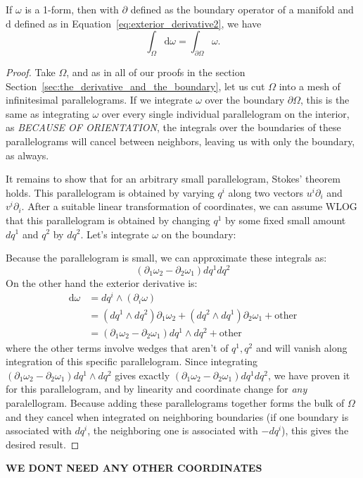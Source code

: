 \documentclass[../master.tex]{subfiles}
\begin{document}
	\begin{theorem}
		If $\omega$ is a 1-form, then with $\partial$ defined as the boundary operator of a manifold and $\mathrm d$ defined as in Equation~\eqref{eq:exterior_derivative2}, we have
		\begin{equation*} 
			\int_\Omega \mathrm d \omega = \int_{\partial \Omega} \omega.
		\end{equation*}
	\end{theorem}
	\begin{proof}
		Take $\Omega$, and as in all of our proofs in the section Section~\ref{sec:the_derivative_and_the_boundary}, let us cut $\Omega$ into a mesh of infinitesimal parallelograms. If we integrate $\omega$ over the boundary $\partial \Omega$, this is the same as integrating $\omega$ over every single individual parallelogram on the interior, as \emph{BECAUSE OF ORIENTATION}, the integrals over the boundaries of these parallelograms will cancel between neighbors, leaving us with only the boundary, as always.
		
		It remains to show that for an arbitrary small parallelogram, Stokes' theorem holds. This parallelogram is obtained by varying $q^i$ along two vectors $u^i \partial_i$ and $v^i \partial_i$. After a suitable linear transformation of coordinates, we can assume WLOG that this parallelogram is obtained by changing $q^1$ by some fixed small amount $dq^1$ and $q^2$ by $dq^2$. Let's integrate $\omega$ on the boundary:
		
		Because the parallelogram is small, we can approximate these integrals as:
		\begin{equation*}
			(\partial_1 \omega_2 - \partial_2 \omega_1) dq^1 dq^2
		\end{equation*}
		On the other hand the exterior derivative is:
		\begin{align*}
			\mathrm d \omega 
			&= dq^i \wedge (\partial_i \omega) \\
			&= (dq^1 \wedge dq^2) \partial_1 \omega_2 + (dq^2 \wedge dq^1)  \partial_2 \omega_1 + \text{other} \\
			&= (\partial_1 \omega_2 - \partial_2 \omega_1) dq^1 \wedge dq^2 + \text{other}
		\end{align*}
		where the other terms involve wedges that aren't of $q^1,q^2$ and will vanish along integration of this specific parallelogram. Since integrating $(\partial_1 \omega_2 - \partial_2 \omega_1) dq^1 \wedge dq^2$ gives exactly $(\partial_1 \omega_2 - \partial_2 \omega_1) dq^1 dq^2$, we have proven it for this parallelogram, and by linearity and coordinate change for \emph{any} paralellogram. Because adding these parallelograms together forms the bulk of $\Omega$ and they cancel when integrated on neighboring boundaries (if one boundary is associated with $dq^i$, the neighboring one is associated with $-dq^i$), this gives the desired result. 
	\end{proof}
	\textbf{WE DONT NEED ANY OTHER COORDINATES}
	
\end{document}
